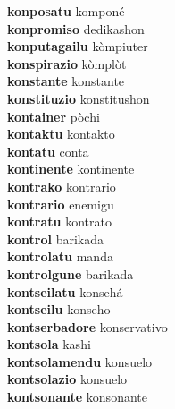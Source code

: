 \textbf{konposatu } komponé \\
\textbf{konpromiso } dedikashon \\
\textbf{konputagailu } kòmpiuter \\
\textbf{konspirazio } kòmplòt \\
\textbf{konstante } konstante \\
\textbf{konstituzio } konstitushon \\
\textbf{kontainer } pòchi \\
\textbf{kontaktu } kontakto \\
\textbf{kontatu } conta \\
\textbf{kontinente } kontinente \\
\textbf{kontrako } kontrario \\
\textbf{kontrario } enemigu \\
\textbf{kontratu } kontrato \\
\textbf{kontrol } barikada \\
\textbf{kontrolatu } manda \\
\textbf{kontrolgune } barikada \\
\textbf{kontseilatu } konsehá \\
\textbf{kontseilu } konseho \\
\textbf{kontserbadore } konservativo \\
\textbf{kontsola } kashi \\
\textbf{kontsolamendu } konsuelo \\
\textbf{kontsolazio } konsuelo \\
\textbf{kontsonante } konsonante \\
